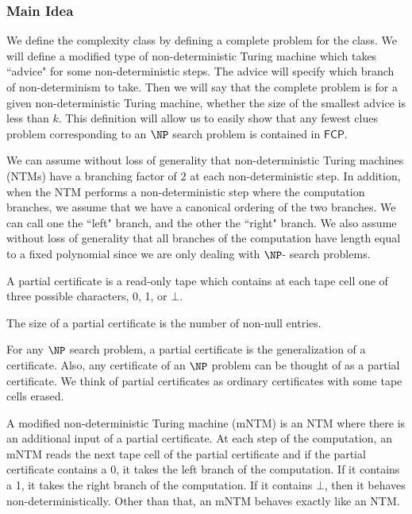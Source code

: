 \documentclass[runningheads,a4paper]{llncs}
\begin{document}
\subsubsection{Main Idea} We define the complexity class by defining a complete problem for the class. We will define a modified type of non-deterministic Turing machine which takes ``advice" for some non-deterministic steps. The advice will specify which branch of non-determinism to take. Then we will say that the complete problem is for a given non-deterministic Turing machine, whether the size of the smallest advice is less than $k$. This definition will allow us to easily show that any fewest clues problem corresponding to an $\NP$ search problem is contained in $\mathsf{FCP}$. 

We can assume without loss of generality that non-deterministic Turing machines (NTMs) have a branching factor of $2$ at each non-deterministic step. In addition, when the NTM performs a non-deterministic step where the computation branches, we assume that we have a canonical ordering of the two branches. We can call one the ``left" branch, and the other the ``right" branch. We also assume without loss of generality that all branches of the computation have length equal to a fixed polynomial since we are only dealing with $\NP$- search problems.

\begin{definition}
A partial certificate is a read-only tape which contains at each tape cell one of three possible characters, 0, 1, or $\bot$.
\end{definition}

\begin{definition}
The size of a partial certificate is the number of non-null entries. 
\end{definition}

For any $\NP$ search problem, a partial certificate is the generalization of a certificate. Also, any certificate of an $\NP$ problem can be thought of as a partial certificate. We think of partial certificates as ordinary certificates with some tape cells erased.

\begin{definition}
A modified non-deterministic Turing machine (mNTM) is an NTM where there is an additional input of a partial certificate. At each step of the computation, an mNTM reads the next tape cell of the partial certificate and if the partial certificate contains a 0, it takes the left branch of the computation. If it contains a 1, it takes the right branch of the computation. If it contains $\bot$, then it behaves non-deterministically. Other than that, an mNTM behaves exactly like an NTM.
\end{definition}
\end{document}
